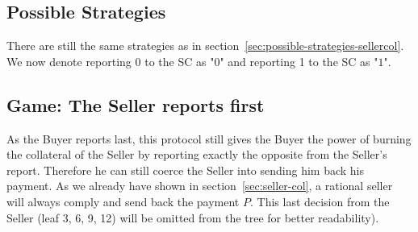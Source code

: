 \documentclass{cacthesis}
\begin{document}
\subsection{Possible Strategies}
\label{sec:sellercol-both-report}
There are still the same strategies as in section~\ref{sec:possible-strategies-sellercol}. We now denote reporting 0 to the SC as "$0$" and reporting 1 to the SC as "$1$".
\subsection{Game: The Seller reports first}
As the Buyer reports last, this protocol still gives the Buyer the power of
burning the collateral of the Seller by reporting exactly the opposite from the
Seller's report.
Therefore he can still coerce the Seller into sending him back his payment. As we already have shown in section~\ref{sec:seller-col}, a rational
seller will always comply and send back the payment $P$. This last decision from the Seller (leaf 3, 6, 9, 12) will be
omitted from the tree for better readability).\newline
\end{document}
